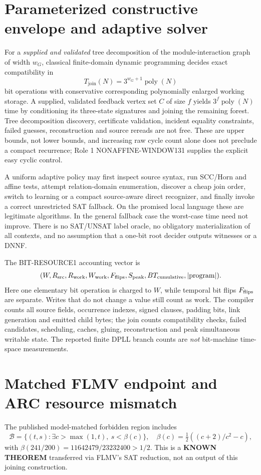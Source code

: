 \documentclass[11pt]{article}
\begin{document}
\section{Parameterized constructive envelope and adaptive solver}
For a \emph{supplied and validated} tree decomposition of the module-interaction graph of width \(w_G\), classical finite-domain dynamic programming decides exact compatibility in
\[
T_{\mathrm{join}}(N)=3^{w_G+1}\operatorname{poly}(N)
\]
bit operations with conservative corresponding polynomially enlarged working storage. A supplied, validated feedback vertex set \(C\) of size \(f\) yields \(3^f\operatorname{poly}(N)\) time by conditioning its three-state signatures and joining the remaining forest. Tree decomposition discovery, certificate validation, incident equality constraints, failed guesses, reconstruction and source rereads are not free. These are upper bounds, not lower bounds, and increasing raw cycle count alone does not preclude a compact recurrence; Role 1 NONAFFINE-WINDOW131 supplies the explicit easy cyclic control.

A uniform adaptive policy may first inspect source syntax, run SCC/Horn and affine tests, attempt relation-domain enumeration, discover a cheap join order, switch to learning or a compact source-aware direct recognizer, and finally invoke a correct unrestricted SAT fallback. On the promised local language these are legitimate algorithms. In the general fallback case the worst-case time need not improve. There is no SAT/UNSAT label oracle, no obligatory materialization of all contexts, and no assumption that a one-bit root decider outputs witnesses or a DNNF.

The BIT-RESOURCE1 accounting vector is
\[
(W,R_{\rm src},R_{\rm work},W_{\rm work},
F_{\rm flips},S_{\rm peak},BT_{\rm cumulative},|\mathrm{program}|).
\]
Here one elementary bit operation is charged to \(W\), while temporal bit flips \(F_{\rm flips}\) are separate. Writes that do not change a value still count as work. The compiler counts all source fields, occurrence indexes, signed clauses, padding bits, link generation and emitted child bytes; the join counts compatibility checks, failed candidates, scheduling, caches, gluing, reconstruction and peak simultaneous writable state. The reported finite DPLL branch counts are \emph{not} bit-machine time-space measurements.

\section{Matched FLMV endpoint and ARC resource mismatch}
The published model-matched forbidden region includes
\[
\mathcal B=\{(t,s):\exists c>\max(1,t),\
 s<\beta(c)\},\quad
\beta(c)=\tfrac12((c+2)/c^2-c),
\]
with \(\beta(241/200)=11642479/23232400>1/2\). This is a \textbf{KNOWN THEOREM} transferred via FLMV's SAT reduction, not an output of this joining construction.
\end{document}
